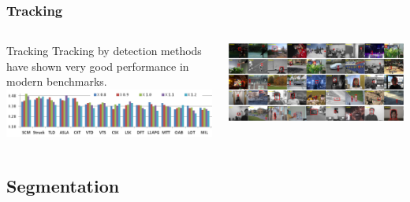 \documentclass{beamer}
\begin{document}
\begin{frame}
	\frametitle{Tracking}
  \begin{columns}[T]
    \begin{column}{.5\textwidth}
		\begin{block}{Tracking}
Tracking by detection methods have shown very good performance in 
modern benchmarks.
\includegraphics[width=1.0\textwidth]{../images/trackers_performance.png}
 	
		\end{block}
    \end{column}
    \begin{column}{.5\textwidth}
		\includegraphics[width=1.0\textwidth]{../images/tr_db.png}
    \end{column}
  \end{columns}
\end{frame}

\subsection{Segmentation}
\end{document}
